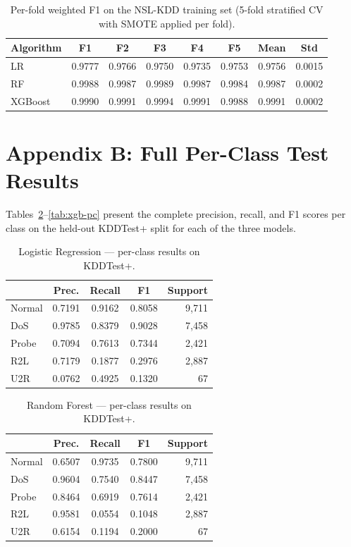 \documentclass[conference, twocolumn]{IEEEtran}
\begin{document}
\begin{table}[!ht]
\centering
\caption{Per-fold weighted F1 on the NSL-KDD training set (5-fold stratified CV with SMOTE applied per fold).}
\label{tab:cvfolds}
\begin{tabular}{lccccc|cc}
\toprule
Algorithm & F1 & F2 & F3 & F4 & F5 & Mean & Std \\
\midrule
LR      & 0.9777 & 0.9766 & 0.9750 & 0.9735 & 0.9753 & 0.9756 & 0.0015 \\
RF      & 0.9988 & 0.9987 & 0.9989 & 0.9987 & 0.9984 & 0.9987 & 0.0002 \\
XGBoost & 0.9990 & 0.9991 & 0.9994 & 0.9991 & 0.9988 & 0.9991 & 0.0002 \\
\bottomrule
\end{tabular}
\end{table}

\section*{Appendix B: Full Per-Class Test Results}

Tables~\ref{tab:lr-pc}--\ref{tab:xgb-pc} present the complete precision, recall, and F1 scores per class on the held-out KDDTest+ split for each of the three models.

\begin{table}[!ht]
\centering
\caption{Logistic Regression --- per-class results on KDDTest+.}
\label{tab:lr-pc}
\begin{tabular}{lcccr}
\toprule
        & Prec. & Recall & F1 & Support \\
\midrule
Normal  & 0.7191 & 0.9162 & 0.8058 & 9{,}711 \\
DoS     & 0.9785 & 0.8379 & 0.9028 & 7{,}458 \\
Probe   & 0.7094 & 0.7613 & 0.7344 & 2{,}421 \\
R2L     & 0.7179 & 0.1877 & 0.2976 & 2{,}887 \\
U2R     & 0.0762 & 0.4925 & 0.1320 &      67 \\
\bottomrule
\end{tabular}
\end{table}

\begin{table}[!ht]
\centering
\caption{Random Forest --- per-class results on KDDTest+.}
\label{tab:rf-pc}
\begin{tabular}{lcccr}
\toprule
        & Prec. & Recall & F1 & Support \\
\midrule
Normal  & 0.6507 & 0.9735 & 0.7800 & 9{,}711 \\
DoS     & 0.9604 & 0.7540 & 0.8447 & 7{,}458 \\
Probe   & 0.8464 & 0.6919 & 0.7614 & 2{,}421 \\
R2L     & 0.9581 & 0.0554 & 0.1048 & 2{,}887 \\
U2R     & 0.6154 & 0.1194 & 0.2000 &      67 \\
\bottomrule
\end{tabular}
\end{table}
\end{document}

